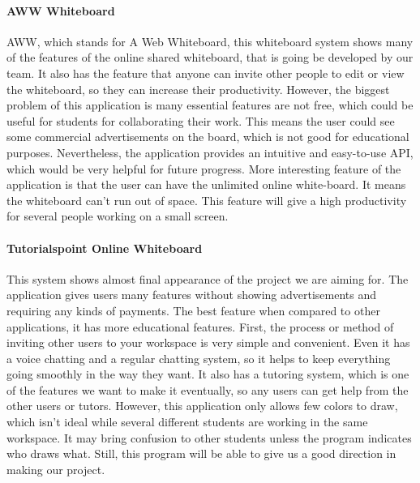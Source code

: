 \documentclass[10pt]{article}
\begin{document}
            \paragraph{AWW Whiteboard}
                AWW, which stands for A Web Whiteboard, this whiteboard system shows many of the features of the online shared whiteboard, that is going be developed by our team. It also has the feature that anyone can invite other people to edit or view the whiteboard, so they can increase their productivity. However, the biggest problem of this application is many essential features are not free, which could be useful for students for collaborating their work. This means the user could see some commercial advertisements on the board, which is not good for educational purposes. Nevertheless, the application provides an intuitive and easy-to-use API, which would be very helpful for future progress. More interesting feature of the application is that the user can have the unlimited online white-board. It means the whiteboard can’t run out of space. This feature will give a high productivity for several people working on a small screen. \cite{AWW}
        
            \paragraph{Tutorialspoint Online Whiteboard}
                 This system shows almost final appearance of the project we are aiming for. The application gives users many features without showing advertisements and requiring any kinds of payments. The best feature when compared to other applications, it has more educational features. First, the process or method of inviting other users to your workspace is very simple and convenient. Even it has a voice chatting and a regular chatting system, so it helps to keep everything going smoothly in the way they want. It also has a tutoring system, which is one of the features we want to make it eventually, so any users can get help from the other users or tutors. However, this application only allows few colors to draw, which isn’t ideal while several different students are working in the same workspace. It may bring confusion to other students unless the program indicates who draws what. Still, this program will be able to give us a good direction in making our project. \cite{TW}
        
\end{document}
